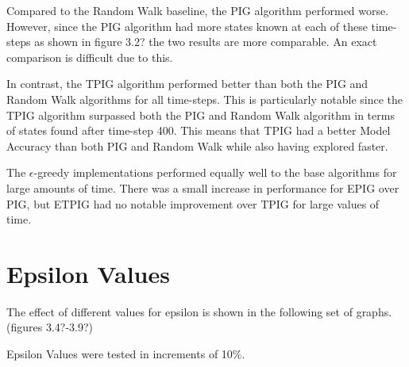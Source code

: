 \documentclass[12pt]{thesis}
\begin{document}
Compared to the Random Walk baseline, the PIG algorithm performed worse. However, since the PIG algorithm had more states known at each of these time-steps as shown in figure 3.2? the two results are more comparable. An exact comparison is difficult due to this.

In contrast, the TPIG algorithm performed better than both the PIG and Random Walk algorithms for all time-steps. This is particularly notable since the TPIG algorithm surpassed both the PIG and Random Walk algorithm in terms of states found after time-step 400. This means that TPIG had a better Model Accuracy than both PIG and Random Walk while also having explored faster.

The $\epsilon$-greedy implementations performed equally well to the base algorithms for large amounts of time. There was a small increase in performance for EPIG over PIG, but ETPIG had no notable improvement over TPIG for large values of time.



\section{Epsilon Values}
The effect of different values for epsilon is shown in the following set of graphs. (figures 3.4?-3.9?)

Epsilon Values were tested in increments of 10\%.
\end{document}
